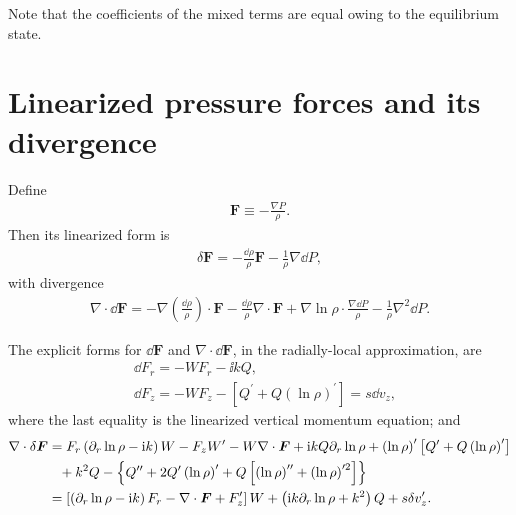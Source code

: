 Note that the coefficients of the mixed terms are equal owing to the
equilibrium state. 


\section{Linearized pressure forces and its divergence}\label{lin_press}
Define
\begin{align}
  \bm{F} \equiv - \frac{\nabla P}{\rho}. 
\end{align}
Then its linearized form is 
\begin{align}
  \delta \bm{F} = - \frac{\dd\rho}{\rho}\bm{F} -
  \frac{1}{\rho}\nabla\dd P,
\end{align}
with divergence
\begin{align}
  \nabla\cdot\dd\bm{F} = -
  \nabla\left(\frac{\dd\rho}{\rho}\right)\cdot\bm{F} -
  \frac{\dd\rho}{\rho}\nabla\cdot\bm{F} +
  \nabla\ln{\rho}\cdot\frac{\nabla\dd P}{\rho} -
  \frac{1}{\rho}\nabla^2\dd P. 
\end{align}


The explicit forms for $\dd\bm{F}$ and $\nabla\cdot\dd\bm{F}$, in the
radially-local approximation, are
\begin{align}
  &\dd F_r = - W F_r - \ii k Q,\\
  &\dd F_z = - W F_z - \left[Q^\prime + Q
    \left(\ln{\rho}\right)^\prime\right]  = s\dd v_z, 
\end{align} 
where the last equality is the linearized
vertical momentum equation; and 
\begin{align}
  \nabla\cdot\delta\bm{F} &= F_r\left(\partial_r\ln{\rho} - \mathrm{i} k \right)W - F_z
  W^\prime - W \nabla\cdot\bm{F} + \mathrm{i} kQ \partial_r\ln{\rho} +
  \left(\ln{\rho}\right)^\prime\left[Q^\prime + Q
    \left(\ln{\rho}\right)^\prime\right] \notag\\
  & \phantom{=} + k^2 Q - \left\{Q^{\prime\prime} + 2
    Q^\prime\left(\ln{\rho}\right)^\prime
    + Q\left[\left(\ln{\rho}\right)^{\prime\prime}+\left(\ln{\rho}\right)^{\prime
      2}\right]\right\}\notag\\
    &= \left[\left(\partial_r\ln{\rho}-\mathrm{i} k\right)F_r - \nabla\cdot\bm{F} +
      F_z^\prime\right]W + \left(\mathrm{i} k \partial_r\ln{\rho} + k^2\right)Q +
    s\delta v_z^\prime.
\end{align}




